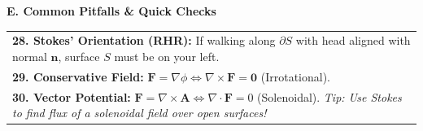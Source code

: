 \documentclass[10pt, landscape, twocolumn]{article}
\begin{document}
\vspace{0.6em}
{\color{themeblue}\normalsize\bfseries E. Common Pitfalls \& Quick Checks} \par
\vspace{-0.2em}
\begin{tabularx}{\linewidth}{|X|}
\hline
\textbf{28. Stokes' Orientation (RHR):} If walking along $\partial S$ with head aligned with normal $\mathbf{n}$, surface $S$ must be on your left. \\
\textbf{29. Conservative Field:} $\mathbf{F} = \nabla \phi \iff \nabla \times \mathbf{F} = \mathbf{0}$ (Irrotational). \\
\textbf{30. Vector Potential:} $\mathbf{F} = \nabla \times \mathbf{A} \iff \nabla \cdot \mathbf{F} = 0$ (Solenoidal). \textit{Tip: Use Stokes to find flux of a solenoidal field over open surfaces!} \\
\hline
\end{tabularx}
\end{document}
